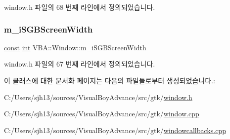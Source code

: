 window.\+h 파일의 68 번째 라인에서 정의되었습니다.

\mbox{\label{class_v_b_a_1_1_window_af01e947f6f9a8fce2de3df5f0420d066}} 
\subsubsection{\texorpdfstring{m\+\_\+i\+S\+G\+B\+Screen\+Width}{m\_iSGBScreenWidth}}
{\footnotesize\ttfamily \mbox{\hyperlink{getopt1_8c_a2c212835823e3c54a8ab6d95c652660e}{const}} \mbox{\hyperlink{_util_8cpp_a0ef32aa8672df19503a49fab2d0c8071}{int}} V\+B\+A\+::\+Window\+::m\+\_\+i\+S\+G\+B\+Screen\+Width}



window.\+h 파일의 67 번째 라인에서 정의되었습니다.



이 클래스에 대한 문서화 페이지는 다음의 파일들로부터 생성되었습니다.\+:\begin{DoxyCompactItemize}
\item 
C\+:/\+Users/sjh13/sources/\+Visual\+Boy\+Advance/src/gtk/\mbox{\hyperlink{window_8h}{window.\+h}}\item 
C\+:/\+Users/sjh13/sources/\+Visual\+Boy\+Advance/src/gtk/\mbox{\hyperlink{window_8cpp}{window.\+cpp}}\item 
C\+:/\+Users/sjh13/sources/\+Visual\+Boy\+Advance/src/gtk/\mbox{\hyperlink{windowcallbacks_8cpp}{windowcallbacks.\+cpp}}\end{DoxyCompactItemize}
